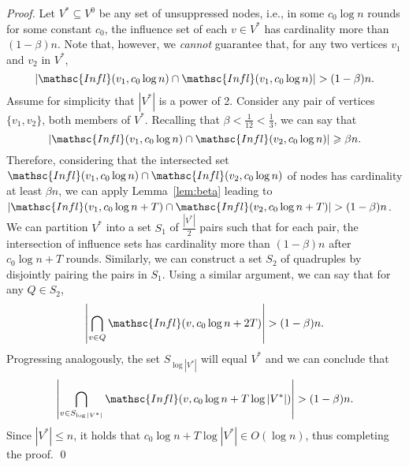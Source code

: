 \documentclass[leqno,11pt]{article}
\renewcommand{\ge}{\geqslant}
\renewcommand{\le}{\leqslant}
\newcommand{\infl}{{\mathsc{Infl}}}
\begin{document}
{\begin{proof}
Let $V^* \subseteq V^0$ be any set of unsuppressed nodes, i.e., in some $c_0
\log n$ rounds for some constant $c_0$, the influence set of each $v \in V^*$
has cardinality more than $(1 - \beta) n$. Note that, however, we {\em cannot}
guarantee that, for any two vertices $v_1$ and $v_2$ in $V^*$, 
\begin{equation*}|\infl(v_1, c_0 \log n) \cap \infl(v_1, c_0 \log n)| > (1 - \beta) n.\end{equation*} 
Assume for simplicity
that $|V^*|$ is a power of 2. Consider any pair of vertices $\{v_1, v_2\}$, both
members of $V^*$. Recalling that $\beta < \frac{1}{12} < \frac{1}{3}$, we can say that
\begin{equation*}\left|\infl(v_1, c_0 \log n) \cap \infl(v_2, c_0 \log n)\right| \ge \beta n.\end{equation*} Therefore,
considering that the intersected set $\infl(v_1, c_0 \log n) \cap \infl(v_2, c_0 \log
n)$ of nodes has cardinality at least $\beta n$, we can apply
Lemma~\ref{lem:beta} leading to $|\infl(v_1, c_0 \log n + T) \cap \infl(v_2, c_0
\log n+T)| > (1-\beta) n$.  We can partition $V^*$ into  a set $S_1$ of
$\frac{|V^*|}{2}$ pairs such that for each pair, the intersection of influence
sets has cardinality more than $(1-\beta)n$ after $c_0 \log n+T$ rounds.
Similarly, we can construct a set $S_2$ of quadruples by disjointly pairing the
pairs in $S_1$. Using a similar argument, we can say that for any  $Q\in S_2$,
\begin{equation*}\left|\bigcap_{v \in Q} \infl(v, c_0 \log n + 2T)\right| > (1-\beta) n.\end{equation*}
Progressing
analogously, the set $S_{\log |V^*|}$ will equal $V^*$ and we can conclude that 
\[
\left |\bigcap_{v \in S_{\log |V^*|}} \infl(v, c_0  \log n + T \log |V^*|) \right | > (1-\beta) n.
\]
Since $|V^*| \le n$, it holds that $c_0  \log n + T \log |V^*| \in O(\log n)$, thus completing the proof. 
\qed
\end{proof}
}
\end{document}
